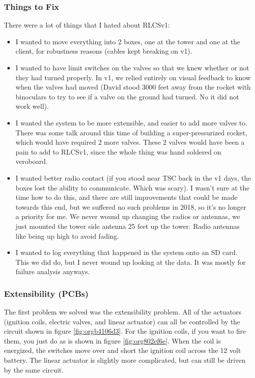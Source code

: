 \documentclass[11pt]{article}
\begin{document}
\subsubsection{Things to Fix}
\label{sec:org1d2c733}

There were a lot of things that I hated about RLCSv1:
\begin{itemize}
\item I wanted to move everything into 2 boxes, one at the tower and one at the
client, for robustness reasons (cables kept breaking on v1).
\item I wanted to have limit switches on the valves so that we knew whether or not
they had turned properly. In v1, we relied entirely on visual feedback to know
when the valves had moved (David stood 3000 feet away from the rocket with
binoculars to try to see if a valve on the ground had turned. No it did not
work well).
\item I wanted the system to be more extensible, and easier to add more valves
to. There was some talk around this time of building a super-pressurized
rocket, which would have required 2 more valves. These 2 valves would have
been a pain to add to RLCSv1, since the whole thing was hand soldered on
veroboard.
\item I wanted better radio contact (if you stood near TSC back in the v1 days, the
boxes lost the ability to communicate. Which was scary). I wasn't sure at the
time how to do this, and there are still improvements that could be made
towards this end, but we suffered no such problems in 2018, so it's no longer
a priority for me. We never wound up changing the radios or antennas, we just
mounted the tower side antenna 25 feet up the tower. Radio antennas like being
up high to avoid fading.
\item I wanted to log everything that happened in the system onto an SD card. This
we did do, but I never wound up looking at the data. It was mostly for failure
analysis anyways.
\end{itemize}

\subsubsection{Extensibility (PCBs)}
\label{sec:org3e39252}

The first problem we solved was the extensibility problem. All of the actuators
(ignition coils, electric valves, and linear actuator) can all be controlled by
the circuit shown in figure \ref{fig:orgb4106d3}. For the ignition coils, if you want
to fire them, you just do as is shown in figure \ref{fig:org802ef6e}. When the coil
is energized, the switches move over and short the ignition coil across the 12
volt battery. The linear actuator is slightly more complicated, but can still be
driven by the same circuit.
\end{document}
